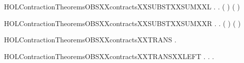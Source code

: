 \newcommand{\HOLContractionTheoremsOBSXXcontractsXXSUBSTXXRESTR}{\UseVerbatim{HOLContractionTheoremsOBSXXcontractsXXSUBSTXXRESTR}}
\begin{SaveVerbatim}{HOLContractionTheoremsOBSXXcontractsXXSUBSTXXSUMXXL}
\HOLTokenTurnstile{} \HOLSymConst{\HOLTokenForall{}} .
          \HOLSymConst{\HOLTokenImp{}}
       \HOLSymConst{\HOLTokenForall{}}.  ( \HOLSymConst{\ensuremath{+}} ) ( \HOLSymConst{\ensuremath{+}} )
\end{SaveVerbatim}
\newcommand{\HOLContractionTheoremsOBSXXcontractsXXSUBSTXXSUMXXL}{\UseVerbatim{HOLContractionTheoremsOBSXXcontractsXXSUBSTXXSUMXXL}}
\begin{SaveVerbatim}{HOLContractionTheoremsOBSXXcontractsXXSUBSTXXSUMXXR}
\HOLTokenTurnstile{} \HOLSymConst{\HOLTokenForall{}} .
          \HOLSymConst{\HOLTokenImp{}}
       \HOLSymConst{\HOLTokenForall{}}.  ( \HOLSymConst{\ensuremath{+}} ) ( \HOLSymConst{\ensuremath{+}} )
\end{SaveVerbatim}
\newcommand{\HOLContractionTheoremsOBSXXcontractsXXSUBSTXXSUMXXR}{\UseVerbatim{HOLContractionTheoremsOBSXXcontractsXXSUBSTXXSUMXXR}}
\begin{SaveVerbatim}{HOLContractionTheoremsOBSXXcontractsXXTRANS}
\HOLTokenTurnstile{} \HOLSymConst{\HOLTokenForall{}}  .
          \HOLSymConst{\HOLTokenConj{}}    \HOLSymConst{\HOLTokenImp{}}
         
\end{SaveVerbatim}
\newcommand{\HOLContractionTheoremsOBSXXcontractsXXTRANS}{\UseVerbatim{HOLContractionTheoremsOBSXXcontractsXXTRANS}}
\begin{SaveVerbatim}{HOLContractionTheoremsOBSXXcontractsXXTRANSXXLEFT}
\HOLTokenTurnstile{} \HOLSymConst{\HOLTokenForall{}} .
          \HOLSymConst{\HOLTokenImp{}}
       \HOLSymConst{\HOLTokenForall{}} .  \HOLTokenTransBegin{}\HOLTokenTransEnd {} \HOLSymConst{\HOLTokenImp{}} \HOLSymConst{\HOLTokenExists{}}.  \HOLTokenTransBegin{}\HOLTokenTransEnd {} \HOLSymConst{\HOLTokenConj{}}   
\end{SaveVerbatim}
